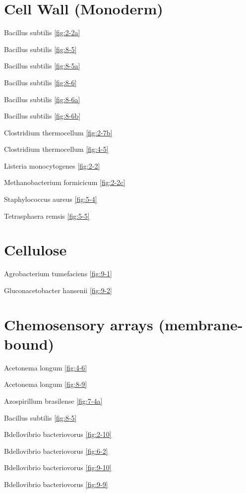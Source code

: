 \documentclass[]{tufte-book}
\begin{document}
\section{\texorpdfstring{\textbf{Cell Wall
(Monoderm)}}{Cell Wall (Monoderm)}}\label{cell-wall-monoderm}

Bacillus subtilis \ref{fig:2-2a}

Bacillus subtilis \ref{fig:8-5}

Bacillus subtilis \ref{fig:8-5a}

Bacillus subtilis \ref{fig:8-6}

Bacillus subtilis \ref{fig:8-6a}

Bacillus subtilis \ref{fig:8-6b}

Clostridium thermocellum \ref{fig:2-7b}

Clostridium thermocellum \ref{fig:4-5}

Listeria monocytogenes \ref{fig:2-2}

Methanobacterium formicicum \ref{fig:2-2c}

Staphylococcus aureus \ref{fig:5-4}

Tetrasphaera remsis \ref{fig:5-5}

\section{\texorpdfstring{\textbf{Cellulose}}{Cellulose}}\label{cellulose}

Agrobacterium tumefaciens \ref{fig:9-1}

Gluconacetobacter hansenii \ref{fig:9-2}

\section{\texorpdfstring{\textbf{Chemosensory arrays
(membrane-bound)}}{Chemosensory arrays (membrane-bound)}}\label{chemosensory-arrays-membrane-bound}

Acetonema longum \ref{fig:4-6}

Acetonema longum \ref{fig:8-9}

Azospirillum brasilense \ref{fig:7-4a}

Bacillus subtilis \ref{fig:8-5}

Bdellovibrio bacteriovorus \ref{fig:2-10}

Bdellovibrio bacteriovorus \ref{fig:6-2}

Bdellovibrio bacteriovorus \ref{fig:9-10}

Bdellovibrio bacteriovorus \ref{fig:9-9}
\end{document}
